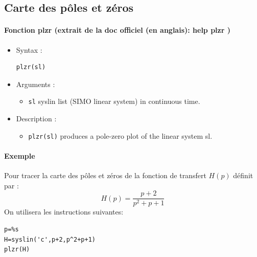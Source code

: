 \subsection{Carte des pôles et zéros}
\begin{doc}
\paragraph{Fonction plzr (extrait de la doc officiel (en anglais): help plzr )}
\begin{itemize}
    \item Syntax :
\begin{code}
\begin{verbatim}
plzr(sl)
\end{verbatim}
\end{code}
    \item Arguments :
    \begin{itemize}
        \item \verb?sl? syslin list (SIMO linear system) in continuous time.
    \end{itemize}
    \item Description :
    \begin{itemize}
        \item \verb?plzr(sl)? produces a pole-zero plot of the linear system sl.
    \end{itemize}
\end{itemize}
\end{doc}

\paragraph{Exemple}
Pour tracer la carte des pôles et zéros de la fonction de transfert $H(p)$ définit 
par :
$$
H(p)=\dfrac{p+2}{p^2+p+1}
$$
On utilisera les instructions suivantes:
\begin{code}
\begin{verbatim}
p=%s
H=syslin('c',p+2,p^2+p+1)
plzr(H)
\end{verbatim}
\end{code}

